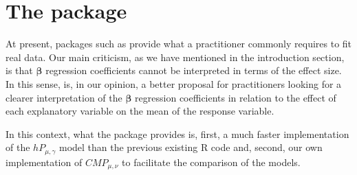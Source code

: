 \section{The  package}

At present, packages such as  provide what a practitioner commonly requires to fit real data. Our main criticism, as we have mentioned in the introduction section, is that $\boldsymbol{\beta}$ regression coefficients cannot be interpreted in terms of the effect size. In this sense,  is, in our opinion, a better proposal for practitioners looking for a clearer interpretation of the $\boldsymbol{\beta}$ regression coefficients in relation to the effect of each explanatory variable on the mean of the response variable.

In this context, what  the  package provides is, first, a much faster implementation of the $hP_{\mu, \gamma}$ model than the previous existing R code and, second, our own implementation of $CMP_{\mu, \nu}$ to facilitate the comparison of the models.

